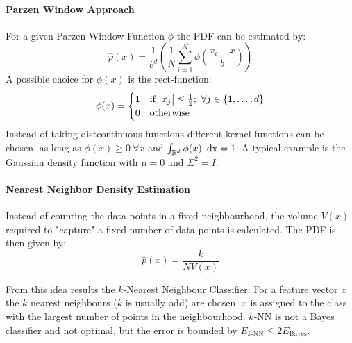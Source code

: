 \paragraph{Parzen Window Approach}
For a given Parzen Window Function $\phi$ the PDF can be estimated by:
\begin{equation*}
    \hat{p}(x) = \frac{1}{b^d} \left( \frac{1}{N} \sum_{i=1}^N \phi\left(\frac{x_i - x}{b}\right) \right)
\end{equation*}
A possible choice for $\phi(x)$ is the rect-function:
\begin{equation*}
    \phi(x) =
        \begin{cases}
            1 & \text{if } \abs{x_j} \leq \frac{1}{2};\ \forall j \in \{1, \ldots, d\} \\
            0 & \text{otherwise}
        \end{cases}
\end{equation*}
Instead of taking distcontinuous functions different kernel functions can be chosen, as long as $\phi(x) \geq 0\ \forall x$ and $\int_{\mathbb{R}^d} \phi(x) \operatorname*{\text{ d}x} = 1$. A typical example is the Gaussian density function with $\mu = 0$ and $\Sigma^2 = I$.

\paragraph{Nearest Neighbor Density Estimation}
Instead of counting the data points in a fixed neighbourhood, the volume $V(x)$ required to "capture" a fixed number of data points is calculated. The PDF is then given by:
\begin{equation*}
    \hat{p}(x) = \frac{k}{N V(x)}
\end{equation*}

From this idea results the $k$-Nearest Neighbour Classifier: For a feature vector $x$ the $k$ nearest neighbours ($k$ is usually odd) are chosen. $x$ is assigned to the class with the largest number of points in the neighbourhood. $k$-NN is not a Bayes classifier and not optimal, but the error is bounded by $E_\text{$k$-NN} \leq 2 E_\text{Bayes}$.
